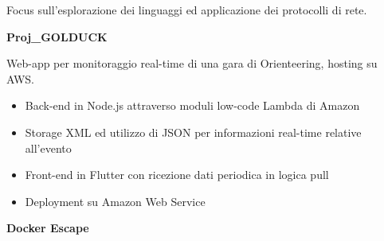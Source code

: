 \documentclass[a4paper]{letter}
\begin{document}
\begin{minipage}[t]{0.30\textwidth}
\setlength{\baselineskip}{1.5\baselineskip}
\color{white}


\end{minipage}
\hfill
\begin{minipage}[t]{0.65\textwidth}
\setlength{\baselineskip}{1.4\baselineskip}

\vspace{2 mm}

\makeatletter
\newcommand{\ProgettiTriennaleBox}{%
}
\makeatother

\ProgettiTriennaleBox

\vspace{0.8 cm}

Focus sull'esplorazione dei linguaggi ed applicazione dei protocolli di rete.

\vspace{2 mm}
{\large \textbf{Proj\_GOLDUCK}}

{\small Web-app per monitoraggio real-time di una gara di Orienteering, hosting su AWS. }

\begin{itemize}
    \item Back-end in Node.js attraverso moduli low-code Lambda di Amazon
    \item Storage XML ed utilizzo di JSON per informazioni real-time relative all'evento
    \item Front-end in Flutter con ricezione dati periodica in logica pull
    \item Deployment su Amazon Web Service
\end{itemize}
\vspace{1 mm}

{\large \textbf{Docker Escape}}


\end{minipage}
\end{document}

